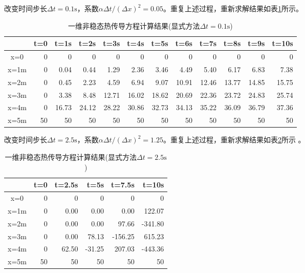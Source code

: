 改变时间步长$\Delta t=0.1\mathrm{s}$，系数$\alpha\Delta t/(\Delta
x)^{2}=0.05$。重复上述过程，重新求解结果如表\ref{TbBD_1dht_result2}所示。
\begin{table}[h!]
  \begin{center}
    \caption{一维非稳态热传导方程计算结果(显式方法$\Delta t=0.1\mathrm{s}$)}
  \label{TbBD_1dht_result2}
  \begin{tabular}{|c|r|r|r|r|r|r|r|r|r|r|r|}
    \hline
 & t=0 & t=1s & t=2s & t=3s & t=4s & t=5s & t=6s & t=7s & t=8s & t=9s & t=10s
 \\
  \hline
x=0 & 0 & 0 & 0 & 0 & 0 & 0 & 0 & 0 & 0 & 0 & 0
\\
\hline
x=1m & 0 & 0.04  & 0.44  & 1.29  & 2.36  & 3.46  & 4.49  & 5.40  & 6.17  & 6.83  & 7.38 
\\
\hline
x=2m & 0 & 0.45  & 2.23  & 4.59  & 6.94  & 9.07  & 10.91  & 12.46  & 13.77  & 14.85  & 15.75 
\\
\hline
x=3m & 0 & 3.38  & 8.48  & 12.71  & 16.02  & 18.62  & 20.69  & 22.36  & 23.72  & 24.83  & 25.74 
\\
\hline
x=4m & 0 & 16.73  & 24.12  & 28.22  & 30.86  & 32.73  & 34.13  & 35.22  & 36.09  & 36.79  & 37.36 
\\
\hline
x=5m & 50 & 50 & 50 & 50 & 50 & 50 & 50 & 50 & 50 & 50 & 50
\\
    \hline
  \end{tabular}
  \end{center}
\end{table}

改变时间步长$\Delta t=2.5\mathrm{s}$，系数$\alpha\Delta t/(\Delta
x)^{2}=1.25$。重复上述过程，重新求解结果如表\ref{TbBD_1dht_result3}所示
。
\begin{table}[h!]
  \begin{center}
    \caption{一维非稳态热传导方程计算结果(显式方法$\Delta t=2.5\mathrm{s}$)}
  \label{TbBD_1dht_result3}
  \begin{tabular}{|c|r|r|r|r|r|}
    \hline
 & t=0 & t=2.5s & t=5s & t=7.5s & t=10s
 \\
  \hline
x=0 & 0 & 0 & 0 & 0 & 0
\\
\hline
x=1m & 0 & 0.00  & 0.00  & 0.00  & 122.07 
\\
\hline
x=2m & 0 & 0.00  & 0.00  & 97.66  & -341.80 
\\
\hline
x=3m & 0 & 0.00  & 78.13  & -156.25  & 615.23 
\\
\hline
x=4m & 0 & 62.50  & -31.25  & 207.03  & -443.36 
\\
\hline
x=5m & 50 & 50 & 50 & 50 & 50 
\\
    \hline
  \end{tabular}
  \end{center}
\end{table}

